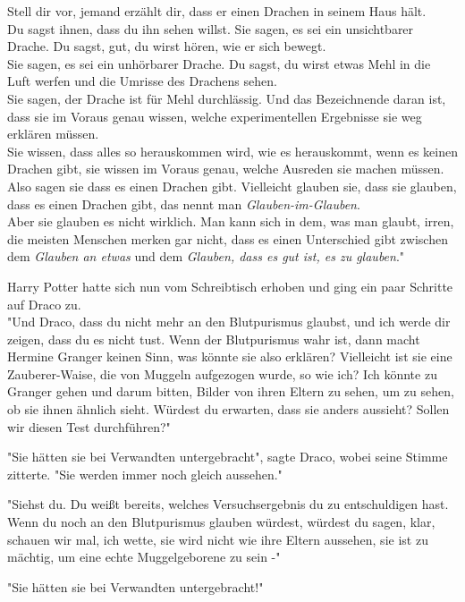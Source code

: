 {Stell dir vor, jemand erzählt dir, dass er einen Drachen in seinem Haus hält.\\ Du sagst ihnen, dass du ihn sehen willst. Sie sagen, es sei ein unsichtbarer Drache. Du sagst, gut, du wirst hören, wie er sich bewegt.\\ Sie sagen, es sei ein unhörbarer Drache. Du sagst, du wirst etwas Mehl in die Luft werfen und die Umrisse des Drachens sehen.\\ Sie sagen, der Drache ist für Mehl durchlässig. Und das Bezeichnende daran ist, dass sie im Voraus genau wissen, welche experimentellen Ergebnisse sie weg erklären müssen.\\ Sie wissen, dass alles so herauskommen wird, wie es herauskommt, wenn es keinen Drachen gibt, sie wissen im Voraus genau, welche Ausreden sie machen müssen.\\ Also sagen sie dass es einen Drachen gibt. Vielleicht glauben sie, dass sie glauben, dass es einen Drachen gibt, das nennt man \emph{Glauben-im-Glauben}.\\ Aber sie glauben es nicht wirklich. Man kann sich in dem, was man glaubt, irren, die meisten Menschen merken gar nicht, dass es einen Unterschied gibt zwischen dem \emph{Glauben an etwas} und dem \emph{Glauben, dass es gut ist, es zu glauben}."

Harry Potter hatte sich nun vom Schreibtisch erhoben und ging ein paar Schritte auf Draco zu.\\ "Und Draco, dass du nicht mehr an den Blutpurismus glaubst, und ich werde dir zeigen, dass du es nicht tust. Wenn der Blutpurismus wahr ist, dann macht Hermine Granger keinen Sinn, was könnte sie also erklären? Vielleicht ist sie eine Zauberer-Waise, die von Muggeln aufgezogen wurde, so wie ich? Ich könnte zu Granger gehen und darum bitten, Bilder von ihren Eltern zu sehen, um zu sehen, ob sie ihnen ähnlich sieht. Würdest du erwarten, dass sie anders aussieht? Sollen wir diesen Test durchführen?"

"Sie hätten sie bei Verwandten untergebracht", sagte Draco, wobei seine Stimme zitterte. "Sie werden immer noch gleich aussehen."

"Siehst du. Du weißt bereits, welches Versuchsergebnis du zu entschuldigen hast.\\ Wenn du noch an den Blutpurismus glauben würdest, würdest du sagen, klar, schauen wir mal, ich wette, sie wird nicht wie ihre Eltern aussehen, sie ist zu mächtig, um eine echte Muggelgeborene zu sein -"

"Sie hätten sie bei Verwandten untergebracht!"

}
